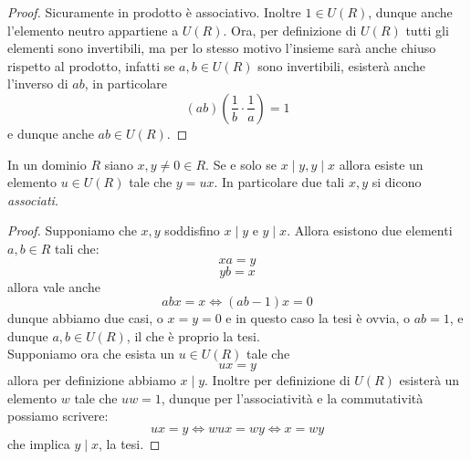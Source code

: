 \documentclass[11pt]{scrartcl}
\begin{document}
	\begin{proof}
		Sicuramente in prodotto è associativo. Inoltre $1\in U(R)$, dunque anche l'elemento neutro appartiene a  $U(R)$. Ora, per definizione di $U(R)$ tutti gli elementi sono invertibili, ma per lo stesso motivo l'insieme sarà anche chiuso rispetto al prodotto, infatti se $a,b\in U(R)$ sono invertibili, esisterà anche l'inverso di $ab$, in particolare
		$$(ab)\left(\frac{1}{b}\cdot\frac{1}{a}\right)=1$$
		e dunque anche $ab\in U(R)$.
	\end{proof}
	\begin{proposition}
		In un dominio $R$ siano $x,y\ne 0\in R$. Se e solo se $x\mid y,y\mid x$ allora esiste un elemento $u\in U(R)$ tale che $y=ux$. In particolare due tali $x,y$ si dicono \textit{associati}.
	\end{proposition}
	\begin{proof}
		Supponiamo che $x,y$ soddisfino $x\mid y$ e $y\mid x$. Allora esistono due elementi $a,b\in R$ tali che:
		$$xa=y$$
		$$yb=x$$
		allora vale anche
		$$abx=x \iff (ab-1)x=0$$
		dunque abbiamo due casi, o $x=y=0$ e in questo caso la tesi è ovvia, o $ab=1$, e dunque $a,b\in U(R)$, il che è proprio la tesi. \\
		Supponiamo ora che esista un $u\in U(R)$ tale che 
		$$ux=y$$
		allora per definizione abbiamo $x\mid y$. Inoltre per definizione di $U(R)$ esisterà un elemento $w$ tale che $uw=1$, dunque per l'associatività e la commutatività possiamo scrivere:
		$$ux=y \iff wux=wy \iff x=wy$$
		che implica $y\mid x$, la tesi.
	\end{proof}
\end{document}
